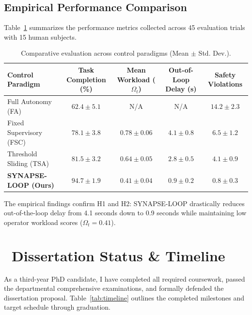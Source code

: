 \documentclass[11pt,a4paper]{scrartcl}
\begin{document}
\subsection{Empirical Performance Comparison}
Table~\ref{tab:results} summarizes the performance metrics collected across 45 evaluation trials with 15 human subjects.

\begin{table}[h!]
    \centering
    \sffamily\small
    \caption{Comparative evaluation across control paradigms (Mean $\pm$ Std. Dev.).}
    \label{tab:results}
    \vspace{4pt}
    \begin{tabularx}{\textwidth}{>{\raggedright\arraybackslash}X c c c c}
        \toprule
        \rowcolor{SlateLight}
        \textbf{Control Paradigm} & \textbf{Task Completion (\%)} & \textbf{Mean Workload ($\Omega_t$)} & \textbf{Out-of-Loop Delay (s)} & \textbf{Safety Violations} \\
        \midrule
        Full Autonomy (FA) & $62.4 \pm 5.1$ & N/A & N/A & $14.2 \pm 2.3$ \\
        Fixed Supervisory (FSC) & $78.1 \pm 3.8$ & $0.78 \pm 0.06$ & $4.1 \pm 0.8$ & $6.5 \pm 1.2$ \\
        Threshold Sliding (TSA) & $81.5 \pm 3.2$ & $0.64 \pm 0.05$ & $2.8 \pm 0.5$ & $4.1 \pm 0.9$ \\
        \rowcolor{TealAccent!12}
        \textbf{SYNAPSE-LOOP (Ours)} & $\mathbf{94.7 \pm 1.9}$ & $\mathbf{0.41 \pm 0.04}$ & $\mathbf{0.9 \pm 0.2}$ & $\mathbf{0.8 \pm 0.3}$ \\
        \bottomrule
    \end{tabularx}
\end{table}

The empirical findings confirm H1 and H2: SYNAPSE-LOOP drastically reduces out-of-the-loop delay from 4.1 seconds down to 0.9 seconds while maintaining low operator workload scores ($\Omega_t = 0.41$).

\vspace{10pt}

\section{\texorpdfstring{\faCalendar\ }{ }Dissertation Status \& Timeline}

As a third-year PhD candidate, I have completed all required coursework, passed the departmental comprehensive examinations, and formally defended the dissertation proposal. Table~\ref{tab:timeline} outlines the completed milestones and target schedule through graduation.
\end{document}
